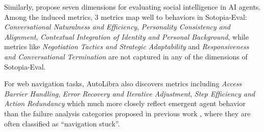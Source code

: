 Similarly, \citet{zhousotopia} propose seven dimensions for evaluating social intelligence in AI agents. Among the induced metrics, 3 metrics map well to behaviors in Sotopia-Eval: \textit{Conversational Naturalness and Efficiency}, \textit{Personality Consistency and Alignment}, \textit{Contextual Integration of Identity and Personal Background}, while metrics like \textit{Negotiation Tactics and Strategic Adaptability} and \textit{Responsiveness and Conversational Termination} are not captured in any of the dimensions of Sotopia-Eval. 

For web navigation tasks, AutoLibra also discovers metrics including \textit{Access Barrier Handling}, \textit{Error Recovery and Iterative Adjustment}, \textit{Step Efficiency and Action Redundancy} which much more closely reflect emergent agent behavior than the failure analysis categories proposed in previous work \citep{he2024webvoyager,zhou2024proposeragentevaluatorpaeautonomousskilldiscovery}, where they are often classified as ``navigation stuck''. %

